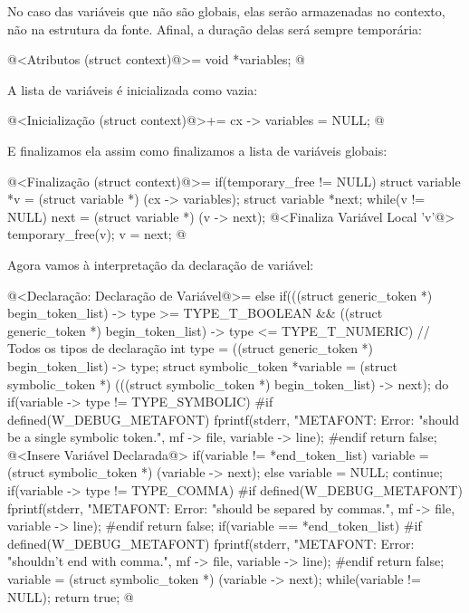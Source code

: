 No caso das variáveis que não são globais, elas serão armazenadas no
contexto, não na estrutura da fonte. Afinal, a duração delas será
sempre temporária:

\iniciocodigo
@<Atributos (struct context)@>=
  void *variables;
@
\fimcodigo

A lista de variáveis é inicializada como vazia:

\iniciocodigo
@<Inicialização (struct context)@>+=
cx -> variables = NULL;
@
\fimcodigo

E finalizamos ela assim como finalizamos a lista de variáveis globais:

\iniciocodigo
@<Finalização (struct context)@>=
if(temporary_free != NULL){
  struct variable *v = (struct variable *) (cx -> variables);
  struct variable *next;
  while(v != NULL){
    next = (struct variable *) (v -> next);
    @<Finaliza Variável Local 'v'@>
    temporary_free(v);
    v = next;
  }
}
@
\fimcodigo

Agora vamos à interpretação da declaração de variável:

\iniciocodigo
@<Declaração: Declaração de Variável@>=
else if(((struct generic_token *) begin_token_list) -> type >=
        TYPE_T_BOOLEAN &&
        ((struct generic_token *) begin_token_list) -> type <=
        TYPE_T_NUMERIC){ // Todos os tipos de declaração
  int type = ((struct generic_token *) begin_token_list) -> type;
  struct symbolic_token *variable = (struct symbolic_token *)
           (((struct symbolic_token *) begin_token_list) -> next);
  do{
    if(variable -> type != TYPE_SYMBOLIC){
#if defined(W_DEBUG_METAFONT)
      fprintf(stderr, "METAFONT: Error: %
                    "should be a single symbolic token.\n", mf -> file,
                    variable -> line);
#endif
      return false;
    }
    @<Insere Variável Declarada@>
    if(variable != *end_token_list)
      variable = (struct symbolic_token *) (variable -> next);
    else{
      variable = NULL;
      continue;
    }
    if(variable -> type != TYPE_COMMA){
#if defined(W_DEBUG_METAFONT)
      fprintf(stderr, "METAFONT: Error: %
                    "should be separed by commas.\n", mf -> file,
                    variable -> line);
#endif
      return false;
    }
    if(variable == *end_token_list){
#if defined(W_DEBUG_METAFONT)
      fprintf(stderr, "METAFONT: Error: %
                    "shouldn't end with comma.\n", mf -> file,
                    variable -> line);
#endif
      return false;
    }
    variable = (struct symbolic_token *) (variable -> next);
  } while(variable != NULL);
  return true;
}
@
\fimcodigo

